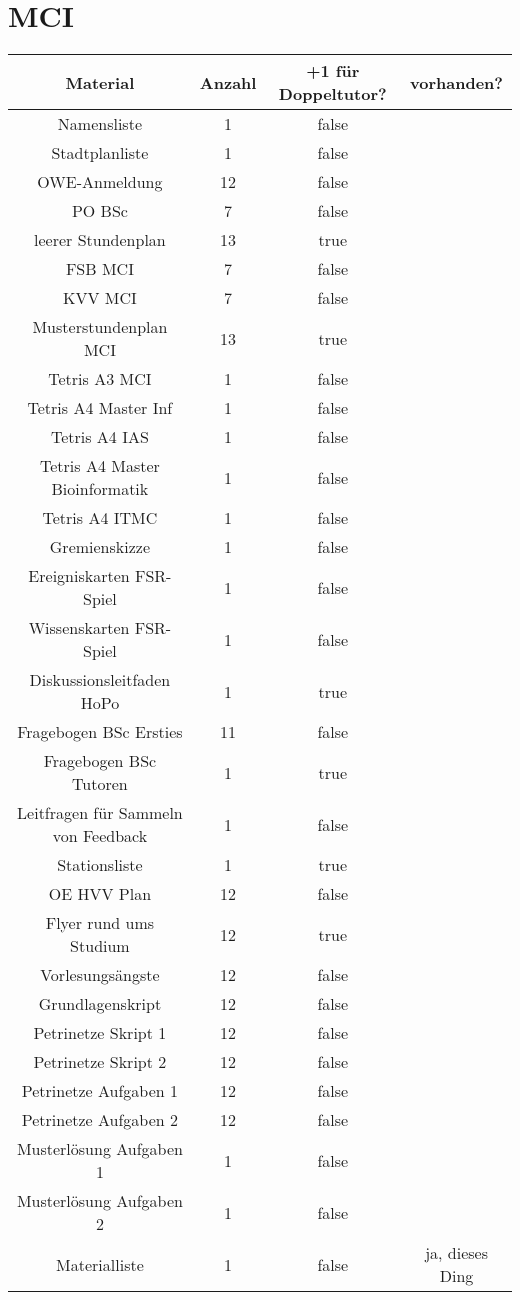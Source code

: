 \documentclass[10pt,a4paper,oneside,ngerman,numbers=noenddot]{scrartcl}
\begin{document}
\section{MCI}

	\begin{tabular}{c|c|c|c}
		\textbf{Material} & \textbf{Anzahl} & \textbf{+1 für Doppeltutor?} & \textbf{vorhanden?} \\
		\hline
		Namensliste & 1 & false & \\
		\hline
		Stadtplanliste & 1 & false & \\
		\hline
		OWE-Anmeldung & 12 & false & \\
		\hline
		PO BSc & 7 & false & \\
		\hline
		leerer Stundenplan & 13 & true & \\
		\hline
		FSB MCI & 7 & false & \\
		\hline
		KVV MCI & 7 & false & \\
		\hline
		Musterstundenplan MCI & 13 & true & \\
		\hline
		Tetris A3 MCI & 1 & false & \\
		\hline
		Tetris A4 Master Inf & 1 & false & \\
		\hline
		Tetris A4 IAS & 1 & false & \\
		\hline
		Tetris A4 Master Bioinformatik & 1 & false & \\
		\hline
		Tetris A4 ITMC & 1 & false & \\
		\hline
		Gremienskizze & 1 & false & \\
		\hline
		Ereigniskarten FSR-Spiel & 1 & false & \\
		\hline
		Wissenskarten FSR-Spiel & 1 & false & \\
		\hline
		Diskussionsleitfaden HoPo & 1 & true & \\
		\hline
		Fragebogen BSc Ersties & 11 & false & \\
		\hline
		Fragebogen BSc Tutoren & 1 & true & \\
		\hline
		Leitfragen für Sammeln von Feedback & 1 & false & \\
		\hline
		Stationsliste & 1 & true & \\
		\hline
		OE HVV Plan & 12 & false & \\
		\hline
		Flyer rund ums Studium & 12 & true & \\
		\hline
		Vorlesungsängste & 12 & false & \\
		\hline
		Grundlagenskript & 12 & false & \\
		\hline
		Petrinetze Skript 1 & 12 & false & \\
		\hline
		Petrinetze Skript 2 & 12 & false & \\
		\hline
		Petrinetze Aufgaben 1 & 12 & false & \\
		\hline
		Petrinetze Aufgaben 2 & 12 & false & \\
		\hline
		Musterlösung Aufgaben 1 & 1 & false & \\
		\hline
		Musterlösung Aufgaben 2 & 1 & false & \\
		\hline
		Materialliste & 1 & false & ja, dieses Ding \\
	\end{tabular}
\end{document}
